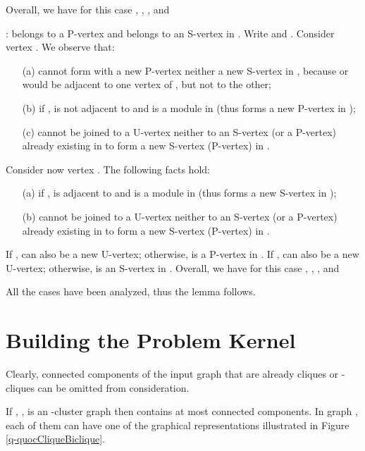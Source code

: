 \documentclass[12pt]{article}
\begin{document}
Overall,
we have for this case
,
,
, and


\medskip

:  belongs to a P-vertex  and 
belongs to an S-vertex  in  .
Write  and . Consider vertex . We observe that:

\begin{itemize}
\item[(a)]  cannot form with  a new P-vertex neither a new S-vertex in , because  or  would be adjacent to one vertex of , but not to the other;

\item[(b)] if ,  is not adjacent to  and  is a module in  (thus  forms a new P-vertex in );

\item[(c)]  cannot be joined to a U-vertex neither to an S-vertex (or a P-vertex) already existing in  to form a new S-vertex (P-vertex) in .
\end{itemize}

Consider now vertex . The following facts hold:
\begin{itemize}
\item[(a)] if ,  is adjacent to  and  is a module in  (thus  forms a new S-vertex in );

\item[(b)]  cannot be joined to a U-vertex neither to an S-vertex (or a P-vertex) already existing in   to form a new S-vertex (P-vertex) in .
\end{itemize}

If ,  can also be a new U-vertex; otherwise,  is a P-vertex in . If ,  can also be a new U-vertex; otherwise,  is an S-vertex in .
Overall,
we have for this case
,
,
, and


\medskip

All the cases have been analyzed, thus the lemma follows. \hfill \framebox[.09in]

\bigskip

\section{Building the Problem Kernel} \label{sec4}


Clearly, connected components of the input graph  that are
already cliques or -cliques can be omitted from
consideration.

If , , is an -cluster graph then  contains at
most  connected components. In graph , each of them
can have one of the graphical representations illustrated in
Figure \ref{q-quocCliqueBiclique}.
\end{document}
